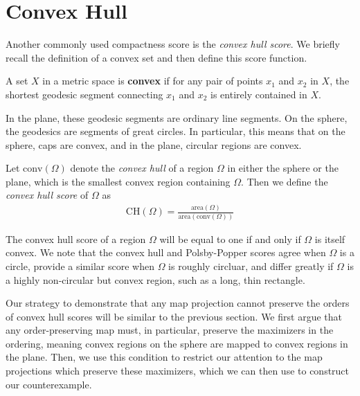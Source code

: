 \section{Convex Hull}\label{sec:ch}
Another commonly used compactness score is the \textit{convex hull
score}.  We briefly recall the definition of a convex set and then
define this score function.

\begin{definition}
  A set $X$ in a metric space is \textbf{convex} if for any pair of
  points $x_1$ and $x_2$ in $X$, the shortest geodesic segment
  connecting $x_1$ and $x_2$ is entirely contained in $X$. 
\end{definition}
In the plane, these geodesic segments are ordinary line segments.  On
the sphere, the geodesics are segments of great circles. In 
particular, this means that on the sphere, caps are 
convex, and in the plane, circular regions are convex.

\begin{definition}
  Let $\mathrm{conv}(\Omega)$ denote the \textit{convex hull} of
  a region $\Omega$ in either the sphere or the plane, which is the
  smallest convex region containing $\Omega$.  Then we define the
  \textit{convex hull score} of $\Omega$ as 
  \begin{align*}
    \mathrm{CH}(\Omega)=
    \frac{\mathrm{area}(\Omega)}{\mathrm{area}(\mathrm{conv}(\Omega))}
  \end{align*}
\end{definition}

The convex hull score of a region $\Omega$  will be equal to one if
and only if $\Omega$ is itself convex.  We note that the convex hull
and Polsby-Popper scores agree when $\Omega$ is a circle, provide
a similar score when $\Omega$ is roughly circluar, and differ greatly
if $\Omega$ is a highly non-circular but convex region, such as
a long, thin rectangle.

Our strategy to demonstrate that any map projection cannot preserve
the orders of convex hull scores will be similar to the previous
section. We first argue that any order-preserving map must, in
particular, preserve the maximizers in the ordering, meaning convex
regions on the sphere are mapped to convex regions in the plane.
Then, we use this condition to restrict our attention to the map
projections which preserve these maximizers, which we can then use to
construct our counterexample.

